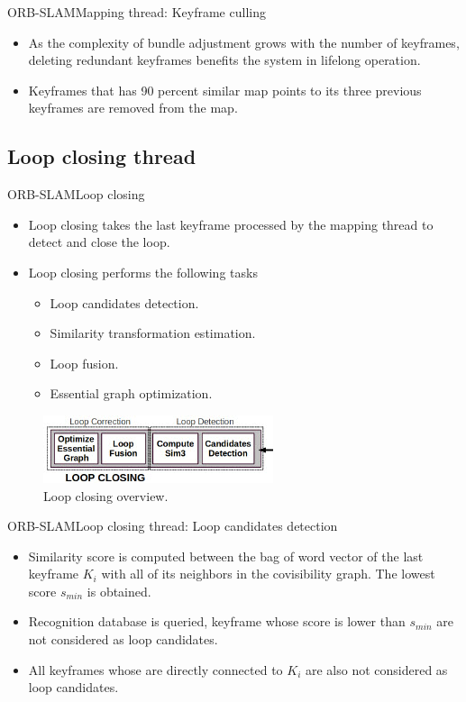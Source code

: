 \documentclass{beamer}
\begin{document}
\begin{frame}{ORB-SLAM}{Mapping thread: Keyframe culling}
  \begin{itemize}
      \item{
      As the complexity of bundle adjustment grows with the number of keyframes, deleting redundant keyframes benefits the system in lifelong operation.
      }
      \item{
      Keyframes that has 90 percent similar map points to its three previous keyframes are removed from the map.
      }
  \end{itemize}
\end{frame}

\subsection{Loop closing thread}
\begin{frame}{ORB-SLAM}{Loop closing}
  \begin{itemize}
      \item{
      Loop closing takes the last keyframe processed by the mapping thread to detect and close the loop.
      }
      \item{
      Loop closing performs the following tasks
      \begin{itemize}
          \item{
          Loop candidates detection.
          }
          \item{
          Similarity transformation estimation.
          }
          \item{
          Loop fusion.
          }
          \item{
          Essential graph optimization.
          }
      \end{itemize}
      }
  \end{itemize}
  \begin{figure}
\includegraphics[scale=0.7]{Figure/LoopClosing}
\caption{Loop closing overview.}
\end{figure}
\end{frame}

\begin{frame}{ORB-SLAM}{Loop closing thread: Loop candidates detection}
  \begin{itemize}
      \item{
      Similarity score is computed between the bag of word vector of the last keyframe $K_{i}$ with all of its neighbors in the covisibility graph. The lowest score $s_{min}$ is obtained.
      }
      \item{
      Recognition database is queried, keyframe whose score is lower than $s_{min}$ are not considered as loop candidates.
      }
      \item{
      All keyframes whose are directly connected to $K_{i}$ are also not considered as loop candidates.
      }
  \end{itemize}
\end{frame}
\end{document}
